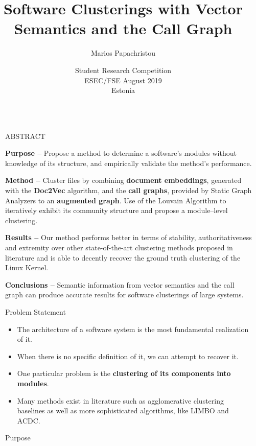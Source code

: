 \documentclass[final]{beamer}
\title{Software Clusterings with Vector Semantics and the Call Graph}
\author[Marios Papachristou]{Marios Papachristou}
\institute[BaLab]{BALab, Athens University of Economics and Bussiness \\ National Technical University of Athens \\ Advisor: Prof. Diomidis Spinellis}
\date[ESEC/FSE 2019 SRC]{Student Research Competition \\ ESEC/FSE August 2019 \\ Estonia}
\newlength{\sepwidth}
\newlength{\colwidth}
\newcommand{\separatorcolumn}{\begin{column}{\sepwidth}\end{column}}
\begin{document}
\begin{frame}[t]
\begin{columns}[t]
\separatorcolumn

\begin{column}{\colwidth}

  \begin{alertblock}{ABSTRACT}
  
  	\textbf{Purpose --}  Propose a method to determine a software’s modules
without knowledge of its structure, and empirically validate the
method’s performance.

	\textbf{Method --} Cluster files by combining \textbf{document embeddings}, generated with the \textbf{Doc2Vec} algorithm, and the \textbf{call graphs}, provided
by Static Graph Analyzers to an \textbf{augmented graph}. Use of the Louvain Algorithm to iteratively exhibit its community structure and propose a module–level clustering.

	\textbf{Results --} Our method performs better in terms of stability, 			authoritativeness and extremity over other state-of-the-art clustering
methods proposed in literature and is able to decently recover the
ground truth clustering of the Linux Kernel.
	
	\textbf{Conclusions --} Semantic information from vector semantics and
the call graph can produce accurate results for software clusterings
of large systems.
  \end{alertblock}


  \begin{block}{Problem Statement}
	
	\begin{itemize}
    \item The architecture of a software system is the most fundamental realization of it.
    \item When there is no specific definition of it, we can attempt to recover it.
    \item One particular problem is the \textbf{clustering of its components into modules}. 
    \item Many methods exist in literature such as agglomerative clustering baselines as well as more sophisticated algorithms, like LIMBO and ACDC. 
\end{itemize}



  \end{block}

  \begin{alertblock}{Purpose}


\end{alertblock}
\end{column}
\end{columns}
\end{frame}
\end{document}
